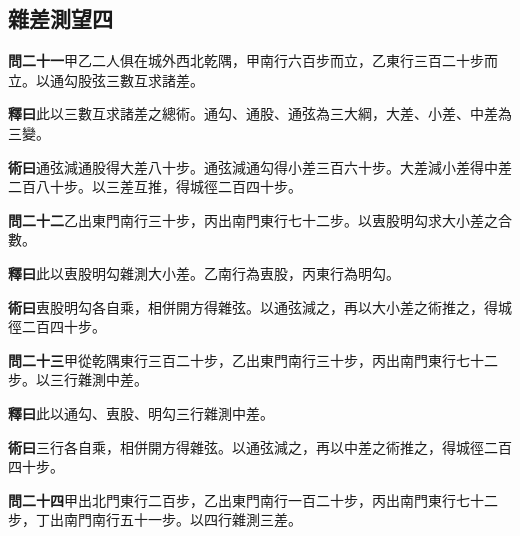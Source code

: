 \documentclass[12pt,a4paper]{article}
\newcommand{\Section}[1]{\subsection*{#1}}
\begin{document}
\Section{雜差測望四}

\noindent\textbf{問二十一}\quad 甲乙二人俱在城外西北乾隅，甲南行六百步而立，乙東行三百二十步而立。以通勾股弦三數互求諸差。

\vspace{0.3em}

\noindent\textbf{釋曰}\quad 此以三數互求諸差之總術。通勾、通股、通弦為三大綱，大差、小差、中差為三變。

\vspace{0.3em}

\noindent\textbf{術曰}\quad 通弦減通股得大差八十步。通弦減通勾得小差三百六十步。大差減小差得中差二百八十步。以三差互推，得城徑二百四十步。

\vspace{0.5em}

\noindent\textbf{問二十二}\quad 乙出東門南行三十步，丙出南門東行七十二步。以叀股明勾求大小差之合數。

\vspace{0.3em}

\noindent\textbf{釋曰}\quad 此以叀股明勾雜測大小差。乙南行為叀股，丙東行為明勾。

\vspace{0.3em}

\noindent\textbf{術曰}\quad 叀股明勾各自乘，相併開方得雜弦。以通弦減之，再以大小差之術推之，得城徑二百四十步。

\vspace{0.5em}

\noindent\textbf{問二十三}\quad 甲從乾隅東行三百二十步，乙出東門南行三十步，丙出南門東行七十二步。以三行雜測中差。

\vspace{0.3em}

\noindent\textbf{釋曰}\quad 此以通勾、叀股、明勾三行雜測中差。

\vspace{0.3em}

\noindent\textbf{術曰}\quad 三行各自乘，相併開方得雜弦。以通弦減之，再以中差之術推之，得城徑二百四十步。

\vspace{0.5em}

\noindent\textbf{問二十四}\quad 甲出北門東行二百步，乙出東門南行一百二十步，丙出南門東行七十二步，丁出南門南行五十一步。以四行雜測三差。

\vspace{0.3em}
\end{document}

